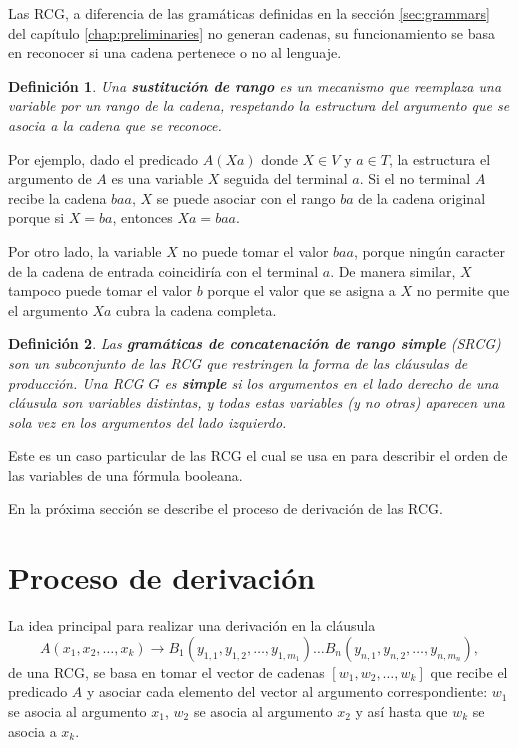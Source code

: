 \documentclass[12pt]{article}
\newtheorem{definition}{Definición}
\begin{document}
Las RCG, a diferencia de las gramáticas definidas en la sección \ref{sec:grammars} del capítulo \ref{chap:preliminaries} no generan cadenas, su funcionamiento se basa en reconocer si una cadena pertenece o no al lenguaje.


\begin{definition}
    Una \textbf{sustitución de rango} es un mecanismo que reemplaza una variable por un 
    rango de la cadena, respetando la estructura del argumento que se asocia a la cadena que se reconoce. 
\end{definition}

Por ejemplo, dado el predicado $A(Xa)$ donde $X \in V$ y $a \in T$, la estructura el argumento de $A$ es una variable $X$ seguida del terminal $a$. Si el no terminal $A$ recibe la cadena $baa$, $X$ se puede asociar con el rango $ba$ de la cadena original porque si $X=ba$, entonces $Xa=baa$.

Por otro lado, la variable $X$ no puede tomar el valor $baa$, porque ningún caracter de la cadena de entrada coincidiría 
con el terminal $a$. De manera similar, $X$ tampoco puede tomar el valor $b$ porque el valor que se asigna a $X$ no permite que el argumento $Xa$ cubra la cadena completa.

\begin{definition}
    Las \textbf{gramáticas de concatenación de rango simple}
    (\textit{SRCG}) son un subconjunto de las RCG que restringen la forma de las cláusulas de producción.  
    Una RCG $G$ es \textbf{simple} si los argumentos en el lado derecho de una cláusula son variables distintas, 
    y todas estas variables (y no otras) aparecen una sola vez en los argumentos del lado izquierdo.  
\end{definition}

Este es un caso particular de las RCG el cual se usa en \cite{aSRCSAT} para describir el orden de las variables de una fórmula booleana. 

En la próxima sección se describe el proceso de derivación de las RCG.

\section{Proceso de derivación}

La idea principal para realizar una derivación en la cláusula 
\[
    A(x_1, x_2, \ldots, x_k) \to B_1(y_{1,1}, y_{1,2}, \ldots, y_{1,m_1}) \ldots B_n(y_{n,1}, y_{n,2}, \ldots, y_{n,m_n}),
\]
de una RCG, se basa en tomar el vector de cadenas $[w_1, w_2,\ldots, w_k]$ que recibe el predicado $A$ y asociar cada elemento del vector al argumento 
correspondiente: $w_1$ se asocia al argumento $x_1$, $w_2$ se asocia al argumento $x_2$ y así hasta que 
$w_k$ se asocia a $x_k$. 
\end{document}
